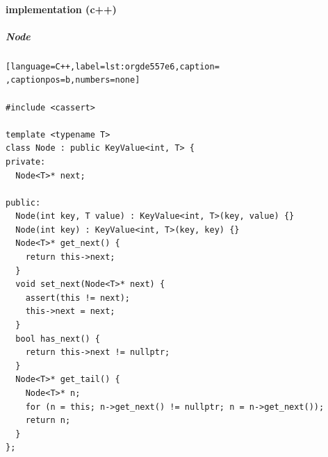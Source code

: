 \documentclass[a4paper,12pt]{article}
\begin{document}
\paragraph{implementation (c++)}
\label{sec:org88530cb}
\subparagraph{Node}
\label{sec:orge94d02c}
\begin{lstlisting}[language=C++,label=lst:orgde557e6,caption= ,captionpos=b,numbers=none]

#include <cassert>

template <typename T>
class Node : public KeyValue<int, T> {
private:
  Node<T>* next;

public:
  Node(int key, T value) : KeyValue<int, T>(key, value) {}
  Node(int key) : KeyValue<int, T>(key, key) {}
  Node<T>* get_next() {
    return this->next;
  }
  void set_next(Node<T>* next) {
    assert(this != next);
    this->next = next;
  }
  bool has_next() {
    return this->next != nullptr;
  }
  Node<T>* get_tail() {
    Node<T>* n;
    for (n = this; n->get_next() != nullptr; n = n->get_next());
    return n;
  }
};
\end{lstlisting}
\end{document}
